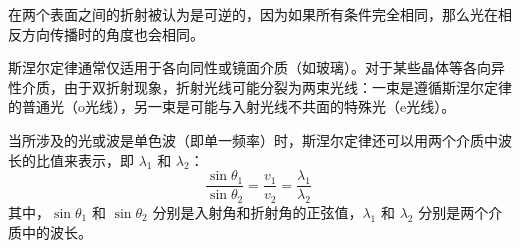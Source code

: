 在两个表面之间的折射被认为是可逆的，因为如果所有条件完全相同，那么光在相反方向传播时的角度也会相同。

斯涅尔定律通常仅适用于各向同性或镜面介质（如玻璃）。对于某些晶体等各向异性介质，由于双折射现象，折射光线可能分裂为两束光线：一束是遵循斯涅尔定律的普通光（o光线），另一束是可能与入射光线不共面的特殊光（e光线）。

当所涉及的光或波是单色波（即单一频率）时，斯涅尔定律还可以用两个介质中波长的比值来表示，即 \(\lambda_1\) 和 \(\lambda_2\)：
\[
\frac{\sin \theta_1}{\sin \theta_2} = \frac{v_1}{v_2} = \frac{\lambda_1}{\lambda_2}~
\]
其中，\(\sin \theta_1\) 和 \(\sin \theta_2\) 分别是入射角和折射角的正弦值，\(\lambda_1\) 和 \(\lambda_2\) 分别是两个介质中的波长。